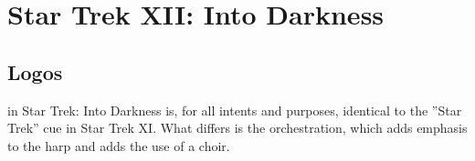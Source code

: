 
\chapter{Star Trek XII: Into Darkness}\label{ch:into_darkness}

\section{Logos}\label{sec:st 12}
 in Star Trek: Into Darkness is, for all intents and purposes, identical to the ''Star Trek'' cue in Star Trek XI. What differs is the orchestration, which adds emphasis to the harp and adds the use of a choir.

\clearpage


